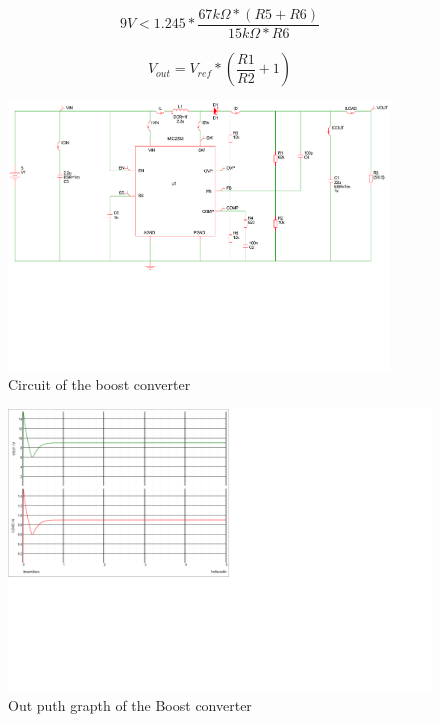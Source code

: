 \documentclass[11pt, titlepage]{article} %
\begin{document}
\begin{equation}
	9V < 1.245 * \frac{67k \Omega * (R5 + R6) }{15k \Omega * R6}	
	\label{eq:ovp} 	
\end{equation}

\begin{equation}
	V_{out} = V_{ref} * (\frac{R1}{R2} + 1)
	\label{eq:vout}
\end{equation}



\begin{figure}
	\includegraphics[width=0.9\textwidth]{boost_converter_curcuit.pdf}
	\caption{Circuit of the boost converter}
	\label{fig:circuit_boost_converter}
\end{figure}

\begin{figure}
	\includegraphics{graph_of_boost_out.png}
	\caption{Out puth grapth of the Boost converter}
	\label{fig:graph_boost}
\end{figure}
\end{document}

